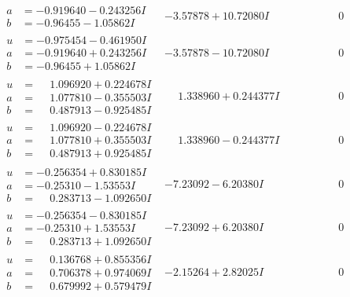 \documentclass[1p]{elsarticle_modified}
\theoremstyle{definition}
\begin{document}
$$\begin{array}{c|c|c}
\begin{aligned}
a &= -0.919640 - 0.243256 I \\
b &= -0.96455 - 1.05862 I\end{aligned}
 & -3.57878 + 10.72080 I & \phantom{-0.000000 } 0 \\ \hline\begin{aligned}
u &= -0.975454 - 0.461950 I \\
a &= -0.919640 + 0.243256 I \\
b &= -0.96455 + 1.05862 I\end{aligned}
 & -3.57878 - 10.72080 I & \phantom{-0.000000 } 0 \\ \hline\begin{aligned}
u &= \phantom{-}1.096920 + 0.224678 I \\
a &= \phantom{-}1.077810 - 0.355503 I \\
b &= \phantom{-}0.487913 - 0.925485 I\end{aligned}
 & \phantom{-}1.338960 + 0.244377 I & \phantom{-0.000000 } 0 \\ \hline\begin{aligned}
u &= \phantom{-}1.096920 - 0.224678 I \\
a &= \phantom{-}1.077810 + 0.355503 I \\
b &= \phantom{-}0.487913 + 0.925485 I\end{aligned}
 & \phantom{-}1.338960 - 0.244377 I & \phantom{-0.000000 } 0 \\ \hline\begin{aligned}
u &= -0.256354 + 0.830185 I \\
a &= -0.25310 - 1.53553 I \\
b &= \phantom{-}0.283713 - 1.092650 I\end{aligned}
 & -7.23092 - 6.20380 I & \phantom{-0.000000 } 0 \\ \hline\begin{aligned}
u &= -0.256354 - 0.830185 I \\
a &= -0.25310 + 1.53553 I \\
b &= \phantom{-}0.283713 + 1.092650 I\end{aligned}
 & -7.23092 + 6.20380 I & \phantom{-0.000000 } 0 \\ \hline\begin{aligned}
u &= \phantom{-}0.136768 + 0.855356 I \\
a &= \phantom{-}0.706378 + 0.974069 I \\
b &= \phantom{-}0.679992 + 0.579479 I\end{aligned}
 & -2.15264 + 2.82025 I & \phantom{-0.000000 } 0 \\ \hline\begin{aligned}

\end{aligned}
\end{array}$$
\end{document}

